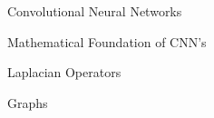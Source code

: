\documentclass[../main.tex]{subfiles}
\begin{document}
    \begin{section}{Convolutional Neural Networks}
           
    \end{section}
    \begin{section}{Mathematical Foundation of CNN's}
           
    \end{section}
    \begin{section}{Laplacian Operators}
           
    \end{section}
    \begin{section}{Graphs} 
            
    \end{section}
\end{document}
